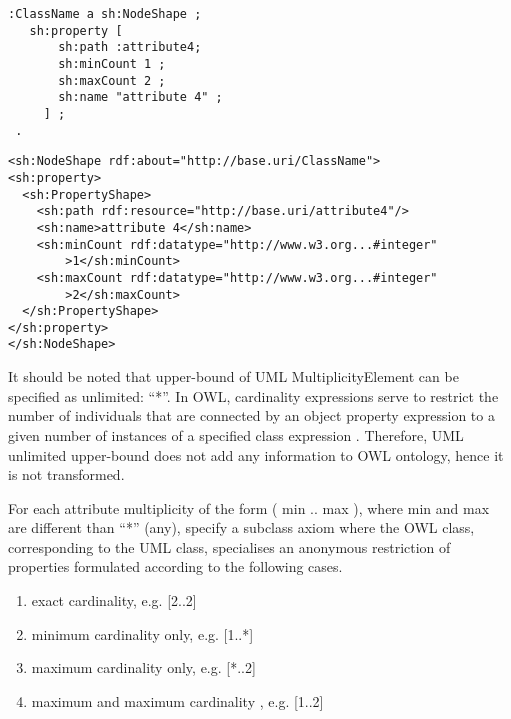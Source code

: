 \vspace{-\parskip}
\begin{minipage}[b]{.385\textwidth}
\begin{lstlisting}[language=Turtle, caption={Min and max cardinality constraint in Turtle syntax}, captionpos=b]
 :ClassName a sh:NodeShape ;
   sh:property [
       sh:path :attribute4;
       sh:minCount 1 ;
       sh:maxCount 2 ;
       sh:name "attribute 4" ;
     ] ;
 .
\end{lstlisting}
\end{minipage}%
\quad\vspace{-\parskip}
\begin{minipage}[b]{.6\textwidth}
\begin{lstlisting}[language=RDF/XML, caption={Min and max cardinality constraint in RDF/XML syntax}, captionpos=b]
<sh:NodeShape rdf:about="http://base.uri/ClassName">
<sh:property>
  <sh:PropertyShape>
    <sh:path rdf:resource="http://base.uri/attribute4"/>
    <sh:name>attribute 4</sh:name>
    <sh:minCount rdf:datatype="http://www.w3.org...#integer"
        >1</sh:minCount>
    <sh:maxCount rdf:datatype="http://www.w3.org...#integer"
        >2</sh:maxCount>        
  </sh:PropertyShape>
</sh:property>
</sh:NodeShape>
\end{lstlisting}
\end{minipage}
\vspace{-\parskip}

It should be noted that upper-bound of UML MultiplicityElement can be
specified as unlimited: ``*''. In OWL, cardinality expressions serve to restrict the
number of individuals that are connected by an object property expression to
a given number of instances of a specified class expression \citep{owl2}. Therefore, UML unlimited upper-bound does not add any information to OWL ontology, hence
it is not transformed.

\begin{trule}
	\label{rule:attribute-rc-multiplicity}
	For each attribute multiplicity of the form ( min .. max ), where min and max are different than ``*'' (any), specify a subclass axiom where the OWL class, corresponding to the UML class, specialises an anonymous restriction of properties formulated according to the following cases.	
	\begin{enumerate}[label=\Alph*.]
		\item exact cardinality, e.g. [2..2]
		\item minimum cardinality only, e.g. [1..*]
		\item maximum cardinality only, e.g. [*..2]
		\item maximum and maximum cardinality , e.g. [1..2]
	\end{enumerate}
\end{trule}


